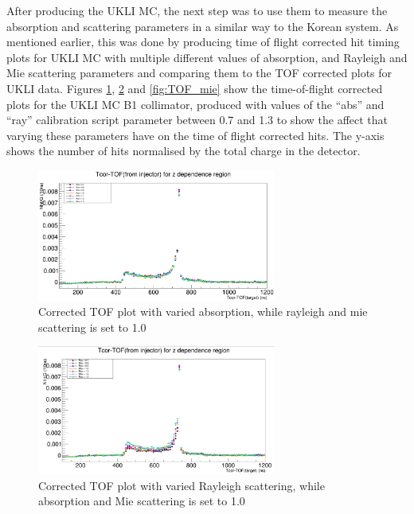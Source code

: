 After producing the UKLI MC, the next step was to use them to measure the absorption and scattering parameters in a similar way to the Korean system. As mentioned earlier, this was done by producing time of flight corrected hit timing plots for UKLI MC with multiple different values of absorption, and Rayleigh and Mie scattering parameters and comparing them to the TOF corrected plots for UKLI data. Figures \ref{fig:TOF_abs}, \ref{fig:TOF_ray} and \ref{fig:TOF_mie} show the time-of-flight corrected plots for the UKLI MC B1 collimator, produced with values of the ``abs'' and ``ray'' calibration script parameter between 0.7 and 1.3 to show the affect that varying these parameters have on the time of flight corrected hits. The y-axis shows the number of hits normalised by the total charge in the detector.

\begin{figure}
    \centering
    \includegraphics[width=0.7\textwidth]{Figures/TOF_abs.PNG}
    \caption{Corrected TOF plot with varied absorption, while rayleigh and mie scattering is set to 1.0}
    \label{fig:TOF_abs}
\end{figure}

\begin{figure}
    \centering
    \includegraphics[width=0.7\textwidth]{Figures/TOF_ray.PNG}
    \caption{Corrected TOF plot with varied Rayleigh scattering, while absorption and Mie scattering is set to 1.0}
    \label{fig:TOF_ray}
\end{figure}

